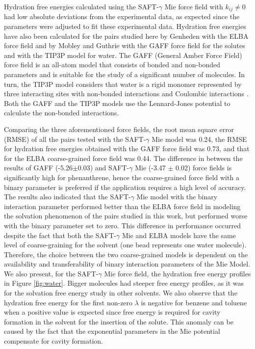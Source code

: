 \documentclass[final,12p,times,twocolumn]{elsarticle}
\begin{document}
	Hydration free energies calculated using the SAFT-$\gamma$ Mie force field with $k_{ij} \neq 0$ had low absolute deviations from the experimental data, as expected since the parameters were adjusted to fit these experimental data. Hydration free energies have also been calculated for the pairs studied here by Genheden \cite{doi:10.1021/acs.jctc.5b00963} with the ELBA force field and by Mobley and Guthrie \cite{PMID:24928188} with the GAFF force field for the solutes and with the TIP3P model for water. The GAFF (General Amber Force Field) force field is an all-atom model that consists of bonded and non-bonded parameters and is suitable for the study of a significant number of molecules. In turn, the TIP3P model considers that water is a rigid monomer represented by three interacting sites with non-bonded interactions and Coulombic interactions \cite{doi:10.1063/1.445869}. Both the GAFF and the TIP3P models use the Lennard-Jones potential to calculate the non-bonded interactions.
	
	Comparing the three aforementioned force fields, the root mean square error (RMSE) of all the pairs tested with the SAFT-$\gamma$ Mie model was  0.24, the RMSE for hydration free energies obtained with the GAFF force field was 0.73, and that for the ELBA coarse-grained force field was 0.44. The difference in between the results of GAFF (-5.26$\pm$0.03) and SAFT-$\gamma$ Mie (-3.47 $\pm$ 0.02) force fields is significantly high for phenanthrene, hence the coarse-grained force field with a binary parameter is preferred if the application requires a high level of accuracy. The results also indicated that the SAFT-$\gamma$ Mie model with the binary interaction parameter performed better than the ELBA force field in modeling the solvation phenomenon of the pairs studied in this work, but performed worse with the binary parameter set to zero. This difference in performance occurred despite the fact that both the SAFT-$\gamma$ Mie and ELBA models have the same level of coarse-graining for the solvent (one bead represents one water molecule). Therefore, the choice between the two coarse-grained models is dependent on the availability and transferability of binary interaction parameters of the Mie Model. We also present, for the SAFT-$\gamma$ Mie force field, the hydration free energy profiles in Figure \ref{fig:water}. Bigger molecules had steeper free energy profiles, as it was for the solvation free energy study in other solvents. We also observe that the hydration free energy for the first non-zero $\lambda$ is negative for benzene and toluene when a positive value is expected since free energy is required for cavity formation in the solvent for the insertion of the solute. This anomaly can be caused by the fact that the exponential parameters in the Mie potential compensate for cavity formation.  
	
\end{document}
